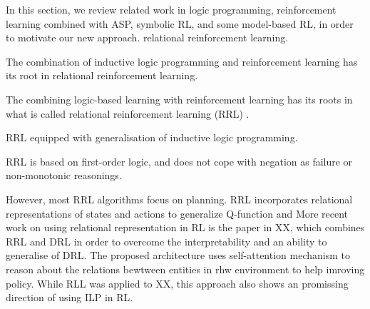 In this section, we review related work in logic programming, reinforcement learning combined with ASP, symbolic RL, and some model-based RL, in order to motivate our new approach.
relational reinforcement learning.

The combination of inductive logic programming and reinforcement learning has its root in relational reinforcement learning. 

The combining logic-based learning with reinforcement learning has its roots in what is called relational reinforcement learning (RRL) \cite{Dzeroski2001}. 

RRL equipped with generalisation of inductive logic programming. 

RRL is based on first-order logic, and does not cope with negation as failure or non-monotonic reasonings.

However, most RRL algorithms focus on planning. 
RRL incorporates relational representations of states and actions to generalize Q-function and 
More recent work on using relational representation in RL is the paper in XX, which combines RRL and DRL in order to overcome the interpretability and an ability to generalise of DRL.
The proposed architecture uses self-attention mechanism to reason about the relations bewtween entities in rhw environment to help imroving policy. 
While RLL was applied to XX, this approach also shows an promissing direction of using ILP in RL.




